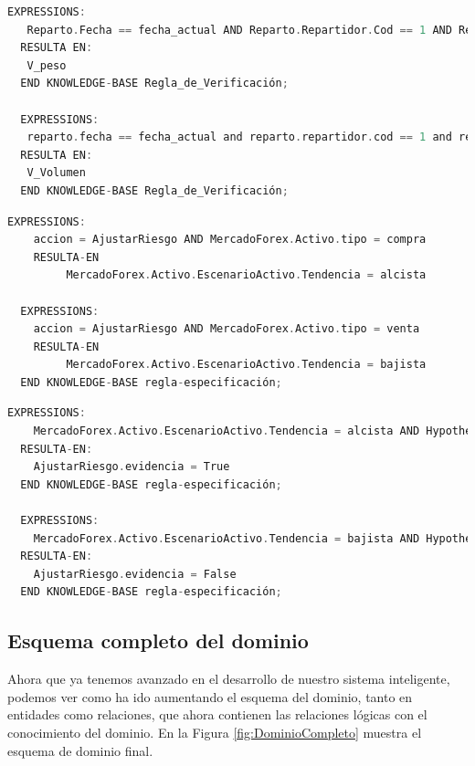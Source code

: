 \begin{lstlisting}[language=C,caption=\textbf{Regla\_de\_Verificación}]
  EXPRESSIONS:
   Reparto.Fecha == fecha_actual AND Reparto.Repartidor.Cod == 1 AND Reparto.Vehiculo.Cod == 1 AND Reparto.pesototal <= Vehiculo.peso_max AND Parametro.valor == false AND Requisitos_obligatorios == Peso
  RESULTA EN:
   V_peso 
  END KNOWLEDGE-BASE Regla_de_Verificación;
  
  EXPRESSIONS:
   reparto.fecha == fecha_actual and reparto.repartidor.cod == 1 and reparto.vehiculo.cod == 1 and reparto.volumentotal <= vehiculo.volumen_carga and parametro.valor == false and requisitos_obligatorios == Volumen
  RESULTA EN:
   V_Volumen 
  END KNOWLEDGE-BASE Regla_de_Verificación;
\end{lstlisting}
    
\begin{lstlisting}[language=C,caption=\textbf{Regla de abstraccion}]
  EXPRESSIONS:
    accion = AjustarRiesgo AND MercadoForex.Activo.tipo = compra
    RESULTA-EN
         MercadoForex.Activo.EscenarioActivo.Tendencia = alcista

  EXPRESSIONS:
    accion = AjustarRiesgo AND MercadoForex.Activo.tipo = venta
    RESULTA-EN
         MercadoForex.Activo.EscenarioActivo.Tendencia = bajista
  END KNOWLEDGE-BASE regla-especificación;
\end{lstlisting}
      
\begin{lstlisting}[language=C,caption=\textbf{Regla de abstraccion}]
  EXPRESSIONS:
    MercadoForex.Activo.EscenarioActivo.Tendencia = alcista AND Hypothesis = AjustarRiesgo
  RESULTA-EN:
    AjustarRiesgo.evidencia = True
  END KNOWLEDGE-BASE regla-especificación;

  EXPRESSIONS:
    MercadoForex.Activo.EscenarioActivo.Tendencia = bajista AND Hypothesis = AjustarRiesgo
  RESULTA-EN:
    AjustarRiesgo.evidencia = False
  END KNOWLEDGE-BASE regla-especificación;

\end{lstlisting}
\newpage

\subsection{Esquema completo del dominio}
Ahora que ya tenemos avanzado en el desarrollo de nuestro sistema inteligente, podemos ver como ha ido aumentando el esquema del dominio, tanto en entidades como relaciones, que ahora contienen las relaciones lógicas con el conocimiento del dominio. En la Figura \ref{fig:DominioCompleto} muestra el esquema de dominio final.

